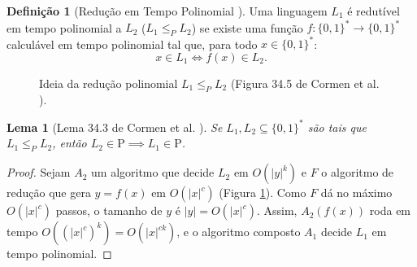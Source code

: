 \documentclass[conference]{IEEEtran}
\theoremstyle{definition}
\newtheorem{definicao}{Definição}
\theoremstyle{plain}
\newtheorem{lema}{Lema}
\begin{document}
\begin{definicao}[Redução em Tempo Polinomial \cite{cormen2012algoritmos}]
Uma linguagem $L_1$ é redutível em tempo polinomial a $L_2$ ($L_1 \le_P L_2$) se existe uma função $f : \{0,1\}^* \to \{0,1\}^*$ calculável em tempo polinomial tal que, para todo $x \in \{0,1\}^*$:
\begin{equation}
x \in L_1 \iff f(x) \in L_2.
\end{equation}
\end{definicao}

\begin{figure}[htbp]
\centering
{}
\caption{Ideia da redução polinomial $L_1 \le_P L_2$ (Figura 34.5 de Cormen et al. \cite{cormen2012algoritmos}).}
\label{fig:reducao_fluxo}
\end{figure}

\begin{lema}[Lema 34.3 de Cormen et al. \cite{cormen2012algoritmos}]
\label{lema:l1_l2_p}
Se $L_1, L_2 \subseteq \{0,1\}^*$ são tais que $L_1 \le_P L_2$, então $L_2 \in \text{P} \implies L_1 \in \text{P}$.
\end{lema}

\begin{proof}
Sejam $A_2$ um algoritmo que decide $L_2$ em $O(|y|^k)$ e $F$ o algoritmo de redução que gera $y = f(x)$ em $O(|x|^c)$ (Figura \ref{fig:reducao_fluxo}). Como $F$ dá no máximo $O(|x|^c)$ passos, o tamanho de $y$ é $|y| = O(|x|^c)$. Assim, $A_2(f(x))$ roda em tempo $O((|x|^c)^k) = O(|x|^{ck})$, e o algoritmo composto $A_1$ decide $L_1$ em tempo polinomial.
\end{proof}
\end{document}
